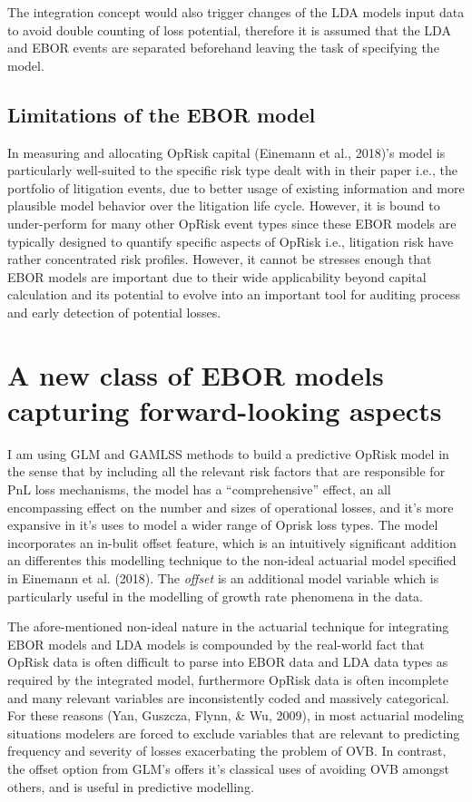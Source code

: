 \documentclass{DissertateUSU}
\begin{document}
The integration concept would also trigger changes of the LDA models
input data to avoid double counting of loss potential, therefore it is
assumed that the LDA and EBOR events are separated beforehand leaving
the task of specifying the model.

\subsection{Limitations of the EBOR model}

In measuring and allocating OpRisk capital (Einemann et al., 2018)'s
model is particularly well-suited to the specific risk type dealt with
in their paper i.e., the portfolio of litigation events, due to better
usage of existing information and more plausible model behavior over the
litigation life cycle. However, it is bound to under-perform for many
other OpRisk event types since these EBOR models are typically designed
to quantify specific aspects of OpRisk i.e., litigation risk have rather
concentrated risk profiles. However, it cannot be stresses enough that
EBOR models are important due to their wide applicability beyond capital
calculation and its potential to evolve into an important tool for
auditing process and early detection of potential losses.

\section{A new class of EBOR models capturing forward-looking aspects}
\label{sec:A new class of EBOR models capturing forward-looking aspects}

I am using GLM and GAMLSS methods to build a predictive OpRisk model in
the sense that by including all the relevant risk factors that are
responsible for PnL loss mechanisms, the model has a ``comprehensive''
effect, an all encompassing effect on the number and sizes of
operational losses, and it's more expansive in it's uses to model a
wider range of Oprisk loss types. The model incorporates an in-bulit
offset feature, which is an intuitively significant addition an
differentes this modelling technique to the non-ideal actuarial model
specified in Einemann et al. (2018). The \emph{offset} is an additional
model variable which is particularly useful in the modelling of growth
rate phenomena in the data.\medskip

The afore-mentioned non-ideal nature in the actuarial technique for
integrating EBOR models and LDA models is compounded by the real-world
fact that OpRisk data is often difficult to parse into EBOR data and LDA
data types as required by the integrated model, furthermore OpRisk data
is often incomplete and many relevant variables are inconsistently coded
and massively categorical. For these reasons (Yan, Guszcza, Flynn, \&
Wu, 2009), in most actuarial modeling situations modelers are forced to
exclude variables that are relevant to predicting frequency and severity
of losses exacerbating the problem of OVB. In contrast, the offset
option from GLM's offers it's classical uses of avoiding OVB amongst
others, and is useful in predictive modelling.
\end{document}
